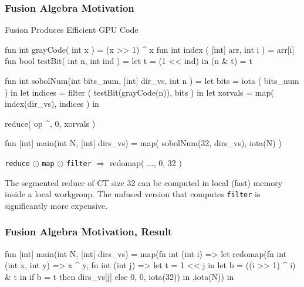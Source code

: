 \documentclass{beamer}
\newcommand{\emp}[1]{\textcolor{DikuRed}{ #1}}
\newcommand{\mymath}[1]{$ #1 $}
\begin{document}
\begin{frame}[fragile]
  \frametitle{Fusion Algebra Motivation}

\begin{block}{ Fusion Produces Efficient GPU Code}
\begin{colorcode}
fun int grayCode( int x            ) = (x >> 1) ^ x
fun int index   ( [int] arr, int i ) = arr[i]
fun bool testBit( int n,   int ind ) = let t = (1 << ind) in (n & t) = t

fun int sobolNum(int bits_num, [int] dir_vs, int n ) =
    let bits    = iota   ( bits_num )                   in
    let indices = \emp{filter} ( testBit(grayCode(n)), bits ) in
    let xorvals = \emp{map}( index(dir_vs), indices )         in

        \emp{reduce}( op ^, 0, xorvals )

fun [int] main(int N, [int] dirs_vs) =
    map( sobolNum(32, dirs_vs), iota(N) )
\end{colorcode}
\end{block}

{\tt reduce} \mymath{\odot} {\tt map} \mymath{\odot} {\tt filter} $\Rightarrow$ redomap( ..., 0, 32 )

\smallskip

The segmented reduce of CT size 32 can be computed in
local (fast) memory inside a local workgroup.
%
The unfused version that computes {\tt filter} is significantly more expensive.

\end{frame}

\begin{frame}[fragile]
\frametitle{Fusion Algebra Motivation, Result}

\begin{colorcode}
fun [int] main(int N, [int] dirs_vs) =
  map(fn int (int i) => let
      redomap(fn int (int x, int y) =>
                x ^ y,
              fn int (int j) =>
                let t = 1 << j in
                let b = ((i >> 1) ^ i) & t in
                if b = t
                  then dirs_vs[j]
                  else 0,
              0, iota(32)) in
      ,iota(N)) in
\end{colorcode}
\end{frame}
\end{document}
